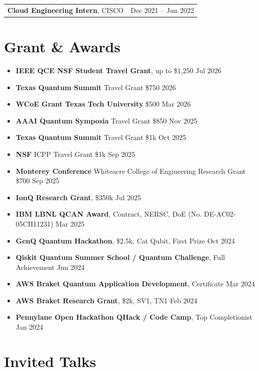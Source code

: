 \documentclass[10pt, letterpaper]{article}
\makeatletter
\newenvironment{bulletentries}{%
    \begin{itemize}[topsep=0.10cm, parsep=0.10cm, partopsep=0pt, itemsep=0pt,
                    leftmargin=10pt]
}{%
    \end{itemize}%
}
\newcommand{\datedentry}[2]{%
    \begin{tabularx}{\linewidth}{@{}>{\raggedright\arraybackslash}X
                                  >{\raggedleft\arraybackslash}p{4.5cm}@{}}
        #1 & #2
    \end{tabularx}%
}
\makeatother
\begin{document}
\vspace{0.2cm}
\datedentry{\textbf{Cloud Engineering Intern}, CISCO}{Dec 2021 -- Jun 2022}

\section{Grant \& Awards}

\begin{bulletentries}
\item \textbf{IEEE QCE NSF Student Travel Grant}, up to \$1,250 \hfill Jul 2026
\item \textbf{Texas Quantum Summit} Travel Grant \$750 \hfill 2026
\item \textbf{WCoE Grant Texas Tech University} \$500 \hfill Mar 2026
\item \textbf{AAAI Quantum Symposia} Travel Grant \$850 \hfill Nov 2025
\item \textbf{Texas Quantum Summit} Travel Grant \$1k \hfill Oct 2025
\item \textbf{NSF} ICPP Travel Grant \$1k \hfill Sep 2025
\item \textbf{Monterey Conference} Whiteacre College of Engineering Research Grant \$700 \hfill Sep 2025
\item \textbf{IonQ Research Grant}, \$350k \hfill Jul 2025
\item \textbf{IBM LBNL QCAN Award}, Contract, NERSC, DoE (No. DE-AC02-05CH11231) \hfill Mar 2025
\item \textbf{GenQ Quantum Hackathon}, \$2.5k, Cat Qubit, First Prize \hfill Oct 2024
\item \textbf{Qiskit Quantum Summer School / Quantum Challenge}, Full Achievement \hfill Jun 2024
\item \textbf{AWS Braket Quantum Application Development}, Certificate \hfill Mar 2024
\item \textbf{AWS Braket Research Grant}, \$2k, SV1, TN1 \hfill Feb 2024
\item \textbf{Pennylane Open Hackathon QHack / Code Camp}, Top Completionist \hfill Jan 2024
\end{bulletentries}

\section{Invited Talks}
\end{document}
